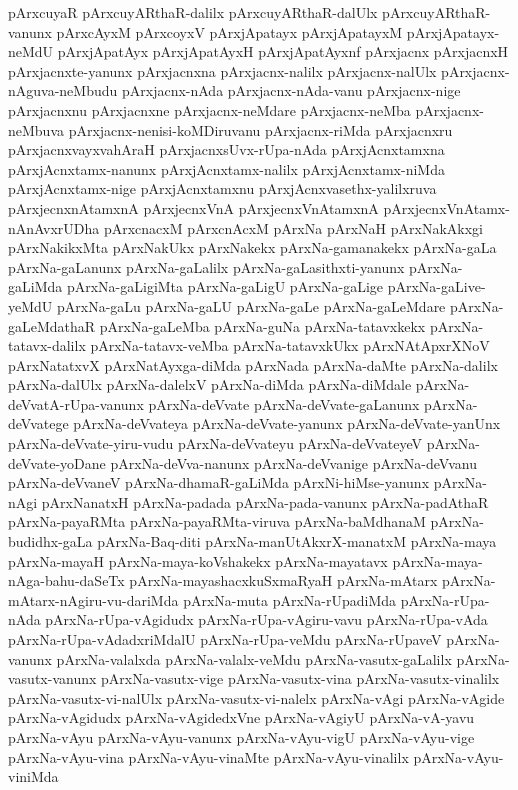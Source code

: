 {pArxcuyaR
pArxcuyARthaR-dalilx
pArxcuyARthaR-dalUlx
pArxcuyARthaR-vanunx
pArxcAyxM
pArxcoyxV
pArxjApatayx
pArxjApatayxM
pArxjApatayx-neMdU
pArxjApatAyx
pArxjApatAyxH
pArxjApatAyxnf
pArxjacnx
pArxjacnxH
pArxjacnxte-yanunx
pArxjacnxna
pArxjacnx-nalilx
pArxjacnx-nalUlx
pArxjacnx-nAguva-neMbudu
pArxjacnx-nAda
pArxjacnx-nAda-vanu
pArxjacnx-nige
pArxjacnxnu
pArxjacnxne
pArxjacnx-neMdare
pArxjacnx-neMba
pArxjacnx-neMbuva
pArxjacnx-nenisi-koMDiruvanu
pArxjacnx-riMda
pArxjacnxru
pArxjacnxvayxvahAraH
pArxjacnxsUvx-rUpa-nAda
pArxjAcnxtamxna
pArxjAcnxtamx-nanunx
pArxjAcnxtamx-nalilx
pArxjAcnxtamx-niMda
pArxjAcnxtamx-nige
pArxjAcnxtamxnu
pArxjAcnxvasethx-yalilxruva
pArxjecnxnAtamxnA
pArxjecnxVnA
pArxjecnxVnAtamxnA
pArxjecnxVnAtamx-nAnAvxrUDha
pArxcnacxM
pArxcnAcxM
pArxNa
pArxNaH
pArxNakAkxgi
pArxNakikxMta
pArxNakUkx
pArxNakekx
pArxNa-gamanakekx
pArxNa-gaLa
pArxNa-gaLanunx
pArxNa-gaLalilx
pArxNa-gaLasithxti-yanunx
pArxNa-gaLiMda
pArxNa-gaLigiMta
pArxNa-gaLigU
pArxNa-gaLige
pArxNa-gaLive-yeMdU
pArxNa-gaLu
pArxNa-gaLU
pArxNa-gaLe
pArxNa-gaLeMdare
pArxNa-gaLeMdathaR
pArxNa-gaLeMba
pArxNa-guNa
pArxNa-tatavxkekx
pArxNa-tatavx-dalilx
pArxNa-tatavx-veMba
pArxNa-tatavxkUkx
pArxNAtApxrXNoV
pArxNatatxvX
pArxNatAyxga-diMda
pArxNada
pArxNa-daMte
pArxNa-dalilx
pArxNa-dalUlx
pArxNa-dalelxV
pArxNa-diMda
pArxNa-diMdale
pArxNa-deVvatA-rUpa-vanunx
pArxNa-deVvate
pArxNa-deVvate-gaLanunx
pArxNa-deVvatege
pArxNa-deVvateya
pArxNa-deVvate-yanunx
pArxNa-deVvate-yanUnx
pArxNa-deVvate-yiru-vudu
pArxNa-deVvateyu
pArxNa-deVvateyeV
pArxNa-deVvate-yoDane
pArxNa-deVva-nanunx
pArxNa-deVvanige
pArxNa-deVvanu
pArxNa-deVvaneV
pArxNa-dhamaR-gaLiMda
pArxNi-hiMse-yanunx
pArxNa-nAgi
pArxNanatxH
pArxNa-padada
pArxNa-pada-vanunx
pArxNa-padAthaR
pArxNa-payaRMta
pArxNa-payaRMta-viruva
pArxNa-baMdhanaM
pArxNa-budidhx-gaLa
pArxNa-Baq-diti
pArxNa-manUtAkxrX-manatxM
pArxNa-maya
pArxNa-mayaH
pArxNa-maya-koVshakekx
pArxNa-mayatavx
pArxNa-maya-nAga-bahu-daSeTx
pArxNa-mayashacxkuSxmaRyaH
pArxNa-mAtarx
pArxNa-mAtarx-nAgiru-vu-dariMda
pArxNa-muta
pArxNa-rUpadiMda
pArxNa-rUpa-nAda
pArxNa-rUpa-vAgidudx
pArxNa-rUpa-vAgiru-vavu
pArxNa-rUpa-vAda
pArxNa-rUpa-vAdadxriMdalU
pArxNa-rUpa-veMdu
pArxNa-rUpaveV
pArxNa-vanunx
pArxNa-valalxda
pArxNa-valalx-veMdu
pArxNa-vasutx-gaLalilx
pArxNa-vasutx-vanunx
pArxNa-vasutx-vige
pArxNa-vasutx-vina
pArxNa-vasutx-vinalilx
pArxNa-vasutx-vi-nalUlx
pArxNa-vasutx-vi-nalelx
pArxNa-vAgi
pArxNa-vAgide
pArxNa-vAgidudx
pArxNa-vAgidedxVne
pArxNa-vAgiyU
pArxNa-vA-yavu
pArxNa-vAyu
pArxNa-vAyu-vanunx
pArxNa-vAyu-vigU
pArxNa-vAyu-vige
pArxNa-vAyu-vina
pArxNa-vAyu-vinaMte
pArxNa-vAyu-vinalilx
pArxNa-vAyu-viniMda
}

